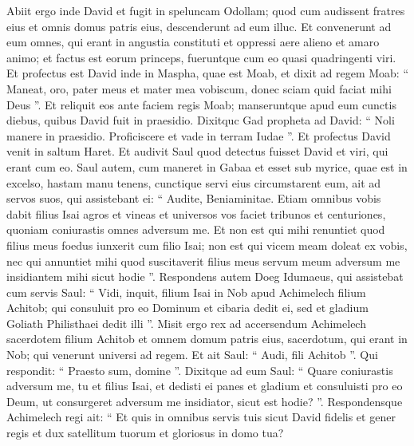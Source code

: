 \begin{biblechapter}
\begin{biblechapter}
\begin{biblechapter}
\begin{biblechapter}
\begin{biblechapter}
\begin{biblechapter}
\begin{biblechapter}
\begin{biblechapter}
\begin{biblechapter}
\begin{biblechapter}
\begin{biblechapter}
\begin{biblechapter}
\begin{biblechapter}
\begin{biblechapter}
\begin{biblechapter}
\begin{biblechapter}
\begin{biblechapter}
\begin{biblechapter}
\begin{biblechapter}
\begin{biblechapter}
\begin{biblechapter}
\begin{biblechapter}
\verse Abiit ergo inde David et fugit in speluncam Odollam; quod cum audissent fratres eius et omnis domus patris eius, descenderunt ad eum illuc. 
\verse Et convenerunt ad eum omnes, qui erant in angustia constituti et oppressi aere alieno et amaro animo; et factus est eorum princeps, fueruntque cum eo quasi quadringenti viri.
 \verse Et profectus est David inde in Maspha, quae est Moab, et dixit ad regem Moab: “ Maneat, oro, pater meus et mater mea vobiscum, donec sciam quid faciat mihi Deus ”. 
\verse Et reliquit eos ante faciem regis Moab; manseruntque apud eum cunctis diebus, quibus David fuit in praesidio.
 \verse Dixitquc Gad propheta ad David: “ Noli manere in praesidio. Proficiscere et vade in terram Iudae ”. Et profectus David venit in saltum Haret.
 \verse Et audivit Saul quod detectus fuisset David et viri, qui erant cum eo. Saul autem, cum maneret in Gabaa et esset sub myrice, quae est in excelso, hastam manu tenens, cunctique servi eius circumstarent eum, 
\verse ait ad servos suos, qui assistebant ei: “ Audite, Beniaminitae. Etiam omnibus vobis dabit filius Isai agros et vineas et universos vos faciet tribunos et centuriones, 
\verse quoniam coniurastis omnes adversum me. Et non est qui mihi renuntiet quod filius meus foedus iunxerit cum filio Isai; non est qui vicem meam doleat ex vobis, nec qui annuntiet mihi quod suscitaverit filius meus servum meum adversum me insidiantem mihi sicut hodie ”.
 \verse Respondens autem Doeg Idumaeus, qui assistebat cum servis Saul: “ Vidi, inquit, filium Isai in Nob apud Achimelech filium Achitob; 
\verse qui consuluit pro eo Dominum et cibaria dedit ei, sed et gladium Goliath Philisthaei dedit illi ”.
 \verse Misit ergo rex ad accersendum Achimelech sacerdotem filium Achitob et omnem domum patris eius, sacerdotum, qui erant in Nob; qui venerunt universi ad regem. 
\verse Et ait Saul: “ Audi, fili Achitob ”. Qui respondit: “ Praesto sum, domine ”. 
\verse Dixitque ad eum Saul: “ Quare coniurastis adversum me, tu et filius Isai, et dedisti ei panes et gladium et consuluisti pro eo Deum, ut consurgeret adversum me insidiator, sicut est hodie? ”. 
\verse Respondensque Achimelech regi ait: “ Et quis in omnibus servis tuis sicut David fidelis et gener regis et dux satellitum tuorum et gloriosus in domo tua? 

\end{biblechapter}
\end{biblechapter}
\end{biblechapter}
\end{biblechapter}
\end{biblechapter}
\end{biblechapter}
\end{biblechapter}
\end{biblechapter}
\end{biblechapter}
\end{biblechapter}
\end{biblechapter}
\end{biblechapter}
\end{biblechapter}
\end{biblechapter}
\end{biblechapter}
\end{biblechapter}
\end{biblechapter}
\end{biblechapter}
\end{biblechapter}
\end{biblechapter}
\end{biblechapter}
\end{biblechapter}
